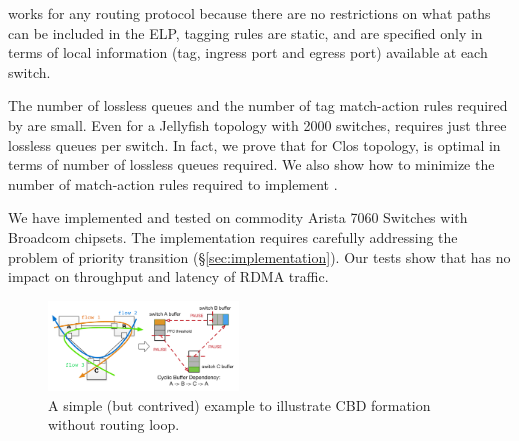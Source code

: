 \sysname{} works for any routing protocol because there are no restrictions on
what paths can be included in the ELP, tagging rules are static, and are
specified only in terms of local information (tag, ingress port and egress port)
available at each switch.

The number of lossless queues and the number of tag match-action rules required
by \sysname{} are small.  Even for a Jellyfish topology with 2000 switches,
\sysname{} requires just three lossless queues per switch.  In fact, we prove
that for Clos topology,  \sysname{} is optimal in terms of number of lossless
queues required.  We also show how to minimize the number of match-action rules
required to implement \sysname{}.

We have implemented and tested \sysname{} on commodity Arista 7060 Switches with
Broadcom chipsets. The implementation requires carefully addressing the problem
of priority transition (\S\ref{sec:implementation}). Our tests show that
\sysname{} has no impact on throughput and latency of RDMA traffic.

\begin{figure}[t]
		\centering
		\includegraphics[width=0.45\textwidth] {figs/deadlock}
		\vspace{-1em}
		\caption{A simple (but contrived) example to illustrate CBD formation
		without routing loop.}
		\vspace{-1em}
		\label{fig:basic_deadlock}
\end{figure}
